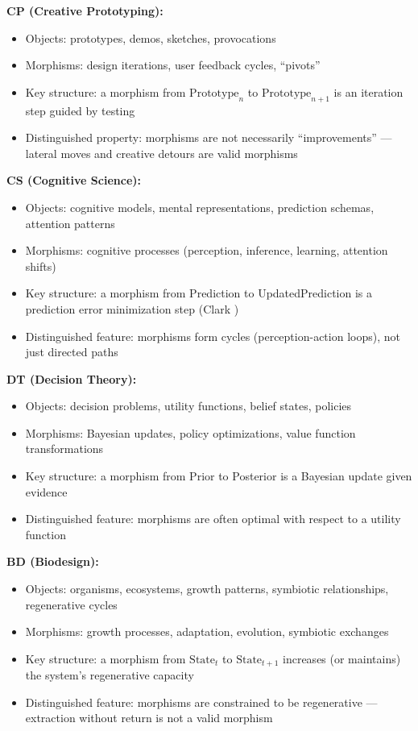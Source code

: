 \documentclass[11pt,a4paper]{article}
\begin{document}
\textbf{CP (Creative Prototyping):}
\begin{itemize}
    \item Objects: prototypes, demos, sketches, provocations
    \item Morphisms: design iterations, user feedback cycles, ``pivots''
    \item Key structure: a morphism from $\mathrm{Prototype}_n$ to $\mathrm{Prototype}_{n+1}$ is an iteration step guided by testing
    \item Distinguished property: morphisms are not necessarily ``improvements'' --- lateral moves and creative detours are valid morphisms
\end{itemize}

\textbf{CS (Cognitive Science):}
\begin{itemize}
    \item Objects: cognitive models, mental representations, prediction schemas, attention patterns
    \item Morphisms: cognitive processes (perception, inference, learning, attention shifts)
    \item Key structure: a morphism from Prediction to UpdatedPrediction is a prediction error minimization step (Clark \cite{clark2013})
    \item Distinguished feature: morphisms form cycles (perception-action loops), not just directed paths
\end{itemize}

\textbf{DT (Decision Theory):}
\begin{itemize}
    \item Objects: decision problems, utility functions, belief states, policies
    \item Morphisms: Bayesian updates, policy optimizations, value function transformations
    \item Key structure: a morphism from Prior to Posterior is a Bayesian update given evidence
    \item Distinguished feature: morphisms are often optimal with respect to a utility function
\end{itemize}

\textbf{BD (Biodesign):}
\begin{itemize}
    \item Objects: organisms, ecosystems, growth patterns, symbiotic relationships, regenerative cycles
    \item Morphisms: growth processes, adaptation, evolution, symbiotic exchanges
    \item Key structure: a morphism from $\mathrm{State}_t$ to $\mathrm{State}_{t+1}$ increases (or maintains) the system's regenerative capacity
    \item Distinguished feature: morphisms are constrained to be regenerative --- extraction without return is not a valid morphism
\end{itemize}
\end{document}
